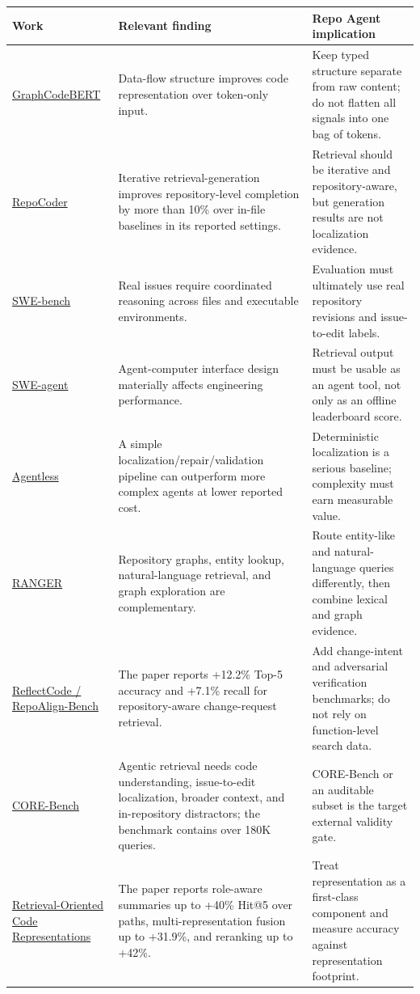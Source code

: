 \documentclass[UTF8,12pt,openany]{ctexbook}
\begin{document}
\begin{center}
\small
\begin{longtable}{|p{}|p{}|p{}|}
\toprule
Work & Relevant finding & Repo Agent implication \\
\midrule
\href{https://arxiv.org/abs/2009.08366}{GraphCodeBERT} & Data-flow structure improves code representation over token-only input. & Keep typed structure separate from raw content; do not flatten all signals into one bag of tokens. \\
\href{https://arxiv.org/abs/2303.12570}{RepoCoder} & Iterative retrieval-generation improves repository-level completion by more than 10\% over in-file baselines in its reported settings. & Retrieval should be iterative and repository-aware, but generation results are not localization evidence. \\
\href{https://arxiv.org/abs/2310.06770}{SWE-bench} & Real issues require coordinated reasoning across files and executable environments. & Evaluation must ultimately use real repository revisions and issue-to-edit labels. \\
\href{https://arxiv.org/abs/2405.15793}{SWE-agent} & Agent-computer interface design materially affects engineering performance. & Retrieval output must be usable as an agent tool, not only as an offline leaderboard score. \\
\href{https://arxiv.org/abs/2407.01489}{Agentless} & A simple localization/repair/validation pipeline can outperform more complex agents at lower reported cost. & Deterministic localization is a serious baseline; complexity must earn measurable value. \\
\href{https://arxiv.org/abs/2509.25257}{RANGER} & Repository graphs, entity lookup, natural-language retrieval, and graph exploration are complementary. & Route entity-like and natural-language queries differently, then combine lexical and graph evidence. \\
\href{https://arxiv.org/abs/2510.24749}{ReflectCode / RepoAlign-Bench} & The paper reports +12.2\% Top-5 accuracy and +7.1\% recall for repository-aware change-request retrieval. & Add change-intent and adversarial verification benchmarks; do not rely on function-level search data. \\
\href{https://arxiv.org/abs/2606.11864}{CORE-Bench} & Agentic retrieval needs code understanding, issue-to-edit localization, broader context, and in-repository distractors; the benchmark contains over 180K queries. & CORE-Bench or an auditable subset is the target external validity gate. \\
\href{https://arxiv.org/abs/2607.11046}{Retrieval-Oriented Code Representations} & The paper reports role-aware summaries up to +40\% Hit@5 over paths, multi-representation fusion up to +31.9\%, and reranking up to +42\%. & Treat representation as a first-class component and measure accuracy against representation footprint. \\
\bottomrule
\end{longtable}
\end{center}
\end{document}
